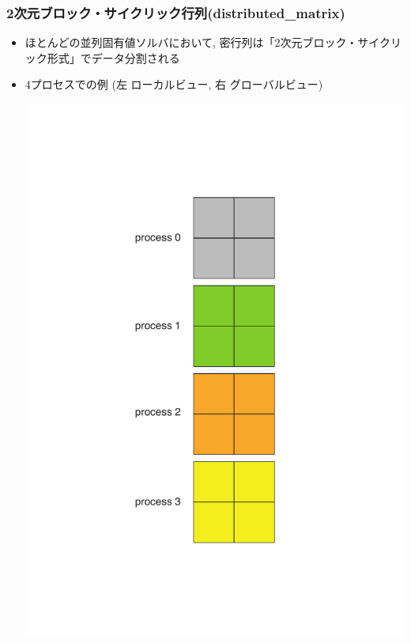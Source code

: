 \begin{frame}
  \frametitle{2次元ブロック・サイクリック行列(distributed\_matrix)}
  \begin{itemize}
  \item ほとんどの並列固有値ソルバにおいて, 密行列は「2次元ブロック・サイクリック形式」でデータ分割される
  \item 4プロセスでの例 (左 ローカルビュー, 右 グローバルビュー)
  \begin{center}
    \includegraphics[height=0.45\textheight]{figure/local-view.pdf} \ \ \ \ \ \ \ \

\end{center}
\end{itemize}
\end{frame}
